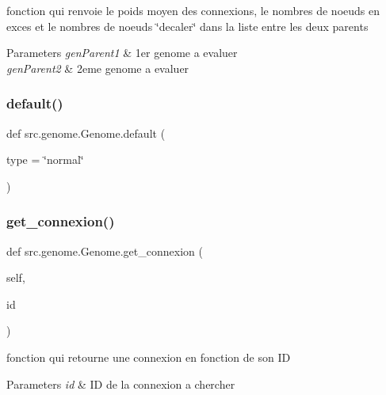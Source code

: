 fonction qui renvoie le poids moyen des connexions, le nombres de noeuds en exces et le nombres de noeuds \char`\"{}decaler\char`\"{} dans la liste entre les deux parents 


\begin{DoxyParams}{Parameters}
{\em gen\+Parent1} & 1er genome a evaluer \\
\hline
{\em gen\+Parent2} & 2eme genome a evaluer \\
\hline
\end{DoxyParams}
\mbox{\label{classsrc_1_1genome_1_1_genome_aae09cdbac38ace26aca0617b2f2c4d26}} 
\subsubsection{\texorpdfstring{default()}{default()}}
{\footnotesize\ttfamily def src.\+genome.\+Genome.\+default (\begin{DoxyParamCaption}\item[{}]{type = {\ttfamily \char`\"{}normal\char`\"{}} }\end{DoxyParamCaption})\hspace{0.3cm}{\ttfamily [static]}}

\mbox{\label{classsrc_1_1genome_1_1_genome_a437bce286bd8650178511ab8f0b6e136}} 
\subsubsection{\texorpdfstring{get\+\_\+connexion()}{get\_connexion()}}
{\footnotesize\ttfamily def src.\+genome.\+Genome.\+get\+\_\+connexion (\begin{DoxyParamCaption}\item[{}]{self,  }\item[{}]{id }\end{DoxyParamCaption})}



fonction qui retourne une connexion en fonction de son ID 


\begin{DoxyParams}{Parameters}
{\em id} & ID de la connexion a chercher \\
\hline
\end{DoxyParams}
\mbox{\label{classsrc_1_1genome_1_1_genome_a9ea67dd37797ab0f058d240eadec28f1}} 
